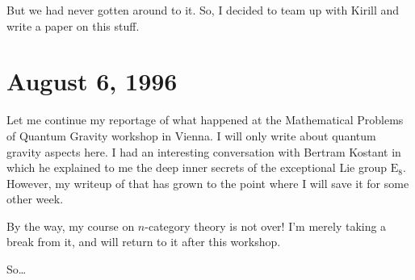 \documentclass{article}
\renewcommand{\texttt}[1]{%
  \begingroup
  \ttfamily
  \begingroup\lccode`~=`/\lowercase{\endgroup\def~}{/\discretionary{}{}{}}%
  \begingroup\lccode`~=`[\lowercase{\endgroup\def~}{[\discretionary{}{}{}}%
  \begingroup\lccode`~=`.\lowercase{\endgroup\def~}{.\discretionary{}{}{}}%
  \catcode`/=\active\catcode`[=\active\catcode`.=\active
  \scantokens{#1\noexpand}%
  \endgroup
}
\begin{document}
\begin{itemize}

  But we had never gotten around to it. So, I decided to team up with
  Kirill and write a paper on this stuff.
\end{itemize}



\hypertarget{week86}{%
\section{August 6, 1996}\label{week86}}

Let me continue my reportage of what happened at the Mathematical
Problems of Quantum Gravity workshop in Vienna. I will only write about
quantum gravity aspects here. I had an interesting conversation with
Bertram Kostant in which he explained to me the deep inner secrets of
the exceptional Lie group \(\mathrm{E}_8\). However, my writeup of that
has grown to the point where I will save it for some other week.

By the way, my course on \(n\)-category theory is not over! I'm merely
taking a break from it, and will return to it after this workshop.

So\ldots{}
\end{document}
